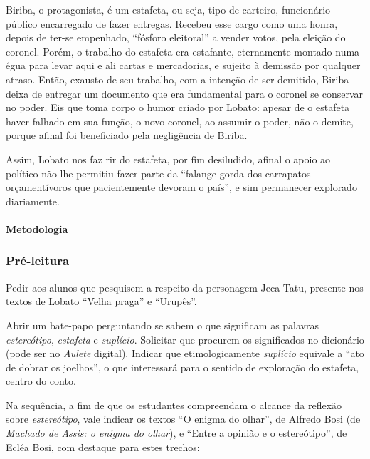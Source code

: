 \documentclass[11pt]{extarticle}
\begin{document}
Biriba, o protagonista, é um estafeta, ou seja, tipo de carteiro,
funcionário público encarregado de fazer entregas. Recebeu esse cargo
como uma honra, depois de ter-se empenhado, ``fósforo eleitoral'' a
vender votos, pela eleição do coronel. Porém, o trabalho do estafeta era
estafante, eternamente montado numa égua para levar aqui e ali cartas e
mercadorias, e sujeito à demissão por qualquer atraso. Então, exausto de
seu trabalho, com a intenção de ser demitido, Biriba deixa de entregar
um documento que era fundamental para o coronel se conservar no poder.
Eis que toma corpo o humor criado por Lobato: apesar de o estafeta haver
falhado em sua função, o novo coronel, ao assumir o poder, não o demite,
porque afinal foi beneficiado pela negligência de Biriba.

Assim, Lobato nos faz rir do estafeta, por fim desiludido, afinal o
apoio ao político não lhe permitiu fazer parte da ``falange gorda dos
carrapatos orçamentívoros que pacientemente devoram o país'', e sim
permanecer explorado diariamente.

\paragraph{Metodologia}

\subsubsection{Pré-leitura}


Pedir aos alunos que pesquisem a respeito da personagem Jeca Tatu,
presente nos textos de Lobato ``Velha praga'' e ``Urupês''.

Abrir um bate-papo perguntando se sabem o que significam as palavras
\emph{estereótipo}, \emph{estafeta} e \emph{suplício}. Solicitar que
procurem os significados no dicionário (pode ser no \emph{Aulete}
digital). Indicar que etimologicamente \emph{suplício} equivale a ``ato
de dobrar os joelhos'', o que interessará para o sentido de exploração
do estafeta, centro do conto.

Na sequência, a fim de que os estudantes compreendam o alcance da
reflexão sobre \emph{estereótipo}, vale indicar os textos ``O enigma do
olhar'', de Alfredo Bosi (de \emph{Machado de Assis: o enigma do
olhar}), e ``Entre a opinião e o estereótipo'', de Ecléa Bosi, com
destaque para estes trechos:
\end{document}

